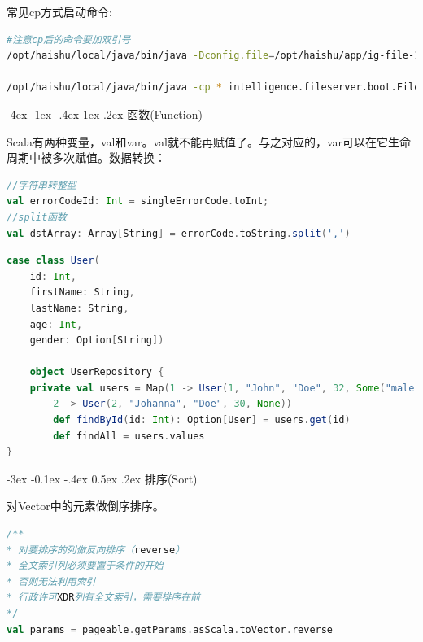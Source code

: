 \documentclass[12pt]{book}
\makeatletter
\numberwithin{dummy}{section}
\theoremstyle{ocrenumbox}
\theoremstyle{blacknumex}
\theoremstyle{blacknumbox}
\theoremstyle{ocrenum}
\renewcommand{\section}{\@startsection{section}{1}{\z@}
	{-4ex \@plus -1ex \@minus -.4ex}
	{1ex \@plus.2ex }
	{\normalfont\large\sffamily\bfseries}}
\renewcommand{\subsection}{\@startsection {subsection}{2}{\z@}
	{-3ex \@plus -0.1ex \@minus -.4ex}
	{0.5ex \@plus.2ex }
	{\normalfont\sffamily\bfseries}}
\makeatother
\begin{document}
常见cp方式启动命令:

\begin{lstlisting}[language=Bash]
#注意cp后的命令要加双引号
/opt/haishu/local/java/bin/java -Dconfig.file=/opt/haishu/app/ig-file-1.0.0/bin/../conf/application.conf -Dpidfile.path=/opt/haishu/app/ig-file-1.0.0/bin/../run/ig-file.pid -Dlogback.configurationFile=/opt/haishu/app/ig-file-1.0.0/bin/../conf/logback.xml -cp "/opt/haishu/app/ig-file-1.0.0/lib/*" intelligence.fileserver.boot.FileBoot -Xms2G -Xmx4G -Xdebug -Xrunjdwp:transport=dt_socket,suspend=n,server=y,address=5006

/opt/haishu/local/java/bin/java -cp * intelligence.fileserver.boot.FileBoot
\end{lstlisting}



\section{函数(Function)}

Scala有两种变量，val和var。val就不能再赋值了。与之对应的，var可以在它生命周期中被多次赋值。数据转换：

\begin{lstlisting}[language=Scala]
//字符串转整型
val errorCodeId: Int = singleErrorCode.toInt;
//split函数
val dstArray: Array[String] = errorCode.toString.split(',')
\end{lstlisting}


\begin{lstlisting}[language=Scala]
case class User(  
	id: Int,  
	firstName: String,  
	lastName: String,  
	age: Int,  
	gender: Option[String])  
	
	object UserRepository {  
	private val users = Map(1 -> User(1, "John", "Doe", 32, Some("male")),  
		2 -> User(2, "Johanna", "Doe", 30, None))  
		def findById(id: Int): Option[User] = users.get(id)  
		def findAll = users.values  
}  
\end{lstlisting}

\subsection{排序(Sort)}

对Vector中的元素做倒序排序。

\begin{lstlisting}[language=Scala]
/**
* 对要排序的列做反向排序（reverse）
* 全文索引列必须要置于条件的开始
* 否则无法利用索引
* 行政许可XDR列有全文索引，需要排序在前
*/
val params = pageable.getParams.asScala.toVector.reverse  
\end{lstlisting}
\end{document}
